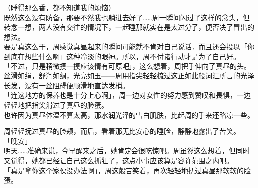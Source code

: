（睡得那么香，都不知道我的烦恼）\\

既然这么没有防备，那要不然我也躺进去好了……周一瞬间闪过了这样的念头，但转念一想，两人没有交往的情况下，一起睡那就实在是太过分了，便否决了冒出的想法。\\

要是真这么干，周感觉真昼起来的瞬间可能就不肯对自己说话，而且还会投以「你到底在想些什么啊」这种冷淡的眼神。所以，周不付诸行动才是为了自己好。\\

「不过，只是稍微摸一摸应该情有可原吧」，这么想着，周把手伸向了真昼的头。\\

丝滑如绢，舒润如绸，光亮如玉——周用指尖轻轻梳过这正如此般词汇所言的光泽长发，没有一丝阻碍便顺滑地直达发梢。\\

「连这地方的保养也是十分上心啊」，周一边对女性的努力感到赞叹和畏惧，一边轻轻地把指尖滑过了真昼的脸蛋。\\

也许因为真昼体温不算太高，那水润光泽的雪白肌肤，比起周的手来还略凉一些。

周轻轻抚过真昼的脸颊，而后，看着那无比安心的睡脸，静静地露出了苦笑。\\

「晚安」\\

明天……准确来说，今早醒来之后，她肯定会很吃惊吧。周虽然这么想着，但同时又觉得，她都已经让自己这么抓狂了，这点小事应该算是容许范围之内吧。\\

「真是拿你这个家伙没办法啊」，周这般苦笑着，再次轻轻地抚过真昼那软软的脸蛋。
